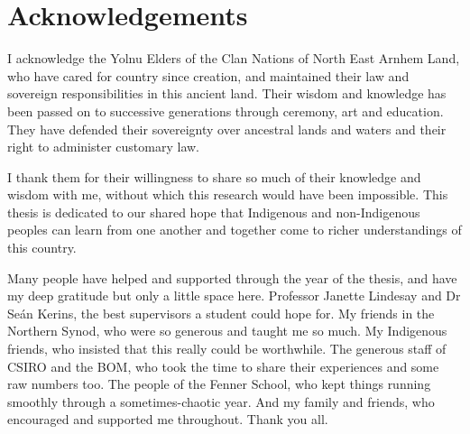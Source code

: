 \chapter{Acknowledgements}

I acknowledge the Yolnu Elders of the Clan Nations of North East Arnhem
Land, who have cared for country since creation, and maintained their
law and sovereign responsibilities in this ancient land.
Their wisdom and knowledge has been passed on to successive generations
through ceremony, art and education.  They have defended their sovereignty
over ancestral lands and waters and their right to administer customary law.

I thank them for their willingness to share so much of their knowledge
and wisdom with me, without which this research would have been impossible.
This thesis is dedicated to our shared hope that Indigenous and non-Indigenous
peoples can learn from one another and together come to richer understandings
of this country.

\vspace{1.5in}

Many people have helped and supported through the year of the thesis,
and have my deep gratitude but only a little space here.  Professor Janette
Lindesay and Dr Seán Kerins, the best supervisors a student could hope for.
My friends in the Northern Synod, who were so generous and taught me so much.
My Indigenous friends, who insisted that this really could be worthwhile.
The generous staff of CSIRO and the BOM, who took the time to share their
experiences and some raw numbers too.  The people of the Fenner School, who
kept things running smoothly through a sometimes-chaotic year.  And
my family and friends, who encouraged and supported me throughout.
Thank you all.
